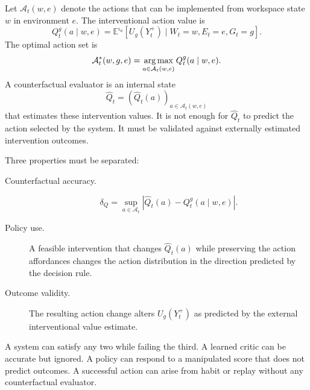 

Let \(\mathcal A_t(w,e)\) denote the actions that can be implemented from
workspace state \(w\) in environment \(e\). The interventional action value is
\[
Q_t^g(a\mid w,e)
=
\mathbb E^{\iota_a}
\left[
U_g(Y_t^+)
\mid
W_t=w,
E_t=e,
G_t=g
\right].
\]
The optimal action set is
\[
\mathcal A_t^*(w,g,e)
=
\operatorname*{arg\,max}_{a\in\mathcal A_t(w,e)}Q_t^g(a\mid w,e).
\]
A counterfactual evaluator is an internal state
\[
\widehat Q_t
=
\left(
\widehat Q_t(a)
\right)_{a\in\mathcal A_t(w,e)}
\]
that estimates these intervention values. It is not enough for
\(\widehat Q_t\) to predict the action selected by the system. It must be
validated against externally estimated intervention outcomes.


Three properties must be separated:
\begin{description}
\item[Counterfactual accuracy.]
\[
\delta_Q
=
\sup_{a\in\mathcal A_t}
|\widehat Q_t(a)-Q_t^g(a\mid w,e)|.
\]

\item[Policy use.]
A feasible intervention that changes \(\widehat Q_t(a)\) while preserving the
action affordances changes the action distribution in the direction predicted
by the decision rule.

\item[Outcome validity.]
The resulting action change alters \(U_g(Y_t^+)\) as predicted by the external
interventional value estimate.
\end{description}

A system can satisfy any two while failing the third. A learned critic can be
accurate but ignored. A policy can respond to a manipulated score that does
not predict outcomes. A successful action can arise from habit or replay
without any counterfactual evaluator.


